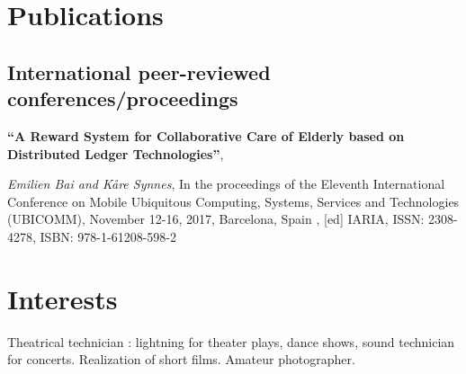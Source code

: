 \documentclass[a4paper]{friggeri-cv}
\begin{document}
\section{Publications}
\subsection{International peer-reviewed conferences/proceedings}
{\textbf{ “A Reward System for Collaborative Care of Elderly based on Distributed Ledger Technologies”}}, 

{\textit {Emilien Bai and Kåre Synnes}}, {\small In the proceedings of the Eleventh International Conference on Mobile Ubiquitous Computing, Systems, Services and Technologies (UBICOMM), November 12-16, 2017, Barcelona, Spain , [ed] IARIA, ISSN: 2308-4278, ISBN: 978-1-61208-598-2}

\section{Interests}
Theatrical technician : lightning for theater plays, dance shows, sound technician for concerts.
Realization of short films. Amateur photographer.
\end{document}
